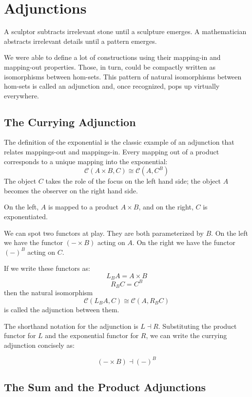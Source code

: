 \documentclass[DaoFP]{subfiles}
\begin{document}
\setcounter{chapter}{9}

\chapter{Adjunctions}

A sculptor subtracts irrelevant stone until a sculpture emerges. A mathematician abstracts irrelevant details until a pattern emerges.

We were able to define a lot of constructions using their mapping-in and mapping-out properties. Those, in turn, could be compactly written as isomorphisms between hom-sets. This pattern of natural isomorphisms between hom-sets is called an adjunction and, once recognized, pops up virtually everywhere.

\section{The Currying Adjunction}

The definition of the exponential is the classic example of an adjunction that relates mappings-out and mappings-in. Every mapping out of a product corresponds to a unique mapping into the exponential:
\[  \mathcal{C}(A \times B, C ) \cong  \mathcal{C} (A, C^B)  \]
The object $C$ takes the role of the focus on the left hand side; the object $A$ becomes the observer on the right hand side. 

On the left, $A$ is mapped to a product $A \times B$, and on the right, $C$ is exponentiated. 

We can spot two functors at play. They are both parameterized by $B$. On the left we have the functor $(- \times B)$ acting on $A$. On the right we have the functor $(-)^B$ acting on $C$. 

If we write these functors as:
\[ L_B A = A \times B \]
\[ R_B C = C^B \]
then the natural isomorphism
\[ \mathcal{C}(L_B A, C) \cong \mathcal{C}(A, R_B C) \]
is called the adjunction between them. 

The shorthand notation for the adjunction is $L \dashv R$. Substituting the product functor for $L$ and the exponential functor for $R$, we can write the currying adjunction concisely as:

\[ (- \times B) \dashv (-)^B \]

\section{The Sum and the Product Adjunctions}
\end{document}
